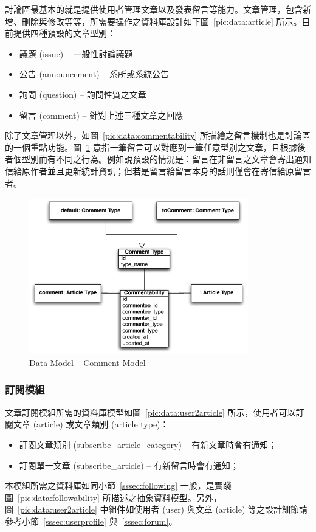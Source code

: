 討論區最基本的就是提供使用者管理文章以及發表留言等能力。文章管理，包含新增、刪除與修改等等，所需要操作之資料庫設計如下圖~\ref{pic:data:article} 所示。目前提供四種預設的文章型別：
\begin{itemize}
\item 議題 (issue) -- 一般性討論議題
\item 公告 (announcement) -- 系所或系統公告
\item 詢問 (question) -- 詢問性質之文章
\item 留言 (comment) -- 針對上述三種文章之回應
\end{itemize}

除了文章管理以外，如圖~\ref{pic:data:commentability} 所描繪之留言機制也是討論區的一個重點功能。圖~\ref{pic:data:comment2article} 意指一筆留言可以對應到一筆任意型別之文章，且根據後者個型別而有不同之行為。例如說預設的情況是：留言在非留言之文章會寄出通知信給原作者並且更新統計資訊；但若是留言給留言本身的話則僅會在寄信給原留言者。

\begin{figure}[H]
\centering
\includegraphics[width=0.85\textwidth]{img/datamodel/comment2article.pdf}
\caption{Data Model -- Comment Model}
\label{pic:data:comment2article}
\end{figure}

\subsubsection{訂閱模組}
\label{sssec:subscription}

文章訂閱模組所需的資料庫模型如圖~\ref{pic:data:user2article} 所示，使用者可以訂閱文章 (article) 或文章類別 (article type)：
\begin{itemize}
\item{訂閱文章類別 (subscribe\_article\_category) -- 有新文章時會有通知；}
\item{訂閱單一文章 (subscribe\_article) -- 有新留言時會有通知；}
\end{itemize}
本模組所需之資料庫如同小節~\ref{sssec:following} 一般，是實踐圖~\ref{pic:data:followability} 所描述之抽象資料模型。另外，圖~\ref{pic:data:user2article} 中組件如使用者 (user) 與文章 (article) 等之設計細節請參考小節~\ref{sssec:userprofile} 與~\ref{sssec:forum}。

